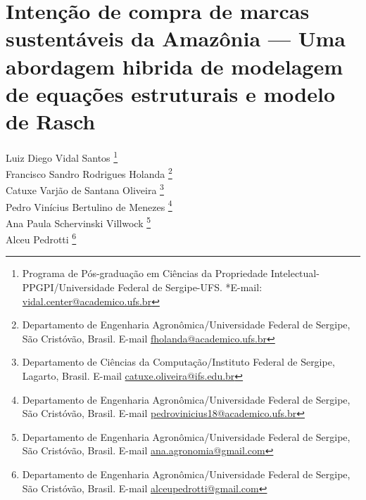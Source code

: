 \chapter{Intenção de compra de marcas sustentáveis da Amazônia — Uma abordagem hibrida de modelagem de equações estruturais e modelo de Rasch}


\begin{flushright}
Luiz Diego Vidal Santos  \footnote[1]{Programa de Pós-graduação em Ciências da Propriedade Intelectual-PPGPI/Universidade Federal de Sergipe-UFS. *E-mail:  \href{mailto:vidal.center@academico.ufs.br}{vidal.center@academico.ufs.br}}
\\[0.2cm] 
Francisco Sandro Rodrigues Holanda \footnote[2]{Departamento de Engenharia Agronômica/Universidade Federal de Sergipe, São Cristóvão, Brasil. E-mail \href{mailto:fholanda@academico.ufs.br}{fholanda@academico.ufs.br}}
\\[0.2cm] 
Catuxe Varjão de Santana Oliveira \footnote[3]{Departamento de Ciências da Computação/Instituto Federal de Sergipe, Lagarto, Brasil. E-mail \href{mailto:catuxe.oliveira@ifs.edu.br}{catuxe.oliveira@ifs.edu.br}}
\\[0.2cm] 
Pedro Vinícius Bertulino de Menezes \footnote[2]{Departamento de Engenharia Agronômica/Universidade Federal de Sergipe, São Cristóvão, Brasil. E-mail \href{mailto:pedrovinicius18@academico.ufs.br}{pedrovinicius18@academico.ufs.br}}
\\[0.2cm] 
Ana Paula Schervinski Villwock \footnote[2]{Departamento de Engenharia Agronômica/Universidade Federal de Sergipe, São Cristóvão, Brasil. E-mail \href{mailto:ana.agronomia@gmail.com}{ana.agronomia@gmail.com}}
\\[0.2cm] 
Alceu Pedrotti \footnote[2]{Departamento de Engenharia Agronômica/Universidade Federal de Sergipe, São Cristóvão, Brasil. E-mail \href{mailto:alceupedrotti@gmail.com}{alceupedrotti@gmail.com}}
\end{flushright}

